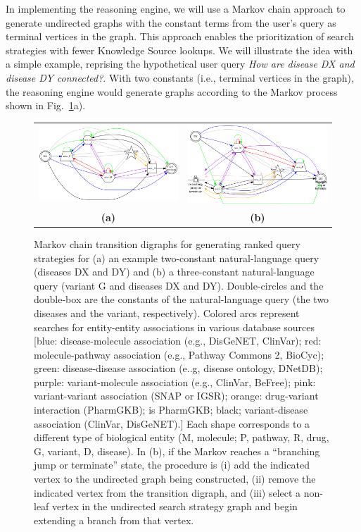 \documentclass[11pt,notitlepage]{article}
\begin{document}
In implementing the reasoning engine, we will use a Markov chain approach to
generate undirected graphs with the constant terms from the user's query as
terminal vertices in the graph. This approach enables the prioritization of
search strategies with fewer Knowledge Source lookups.  We will illustrate the
idea with a simple example, reprising the hypothetical user query {\em How are
  disease DX and disease DY connected?}. With two constants (i.e., terminal
vertices in the graph), the reasoning engine would generate graphs according to
the Markov process shown in Fig.~\ref{fig:mp}a).
\begin{figure}[h!]
  \begin{tabular}{cc}
    \includegraphics[width=3in]{markov1.png} &
    \includegraphics[width=3in]{markov2.png} \\
                    {\bf (a)} & {\bf (b)}
  \end{tabular}
  \caption{Markov chain transition digraphs for generating ranked query
    strategies for (a) an example two-constant natural-language query (diseases
    DX and DY) and (b) a three-constant natural-language query (variant G and
    diseases DX and DY). Double-circles and the double-box are the constants of
    the natural-language query (the two diseases and the variant, respectively).
    Colored arcs represent searches for entity-entity associations in various
    database sources [blue: disease-molecule association (e.g., DisGeNET,
      ClinVar); red: molecule-pathway association (e.g., Pathway Commons 2,
      BioCyc); green: disease-disease association (e..g, disease ontology,
      DNetDB); purple: variant-molecule association (e.g., ClinVar, BeFree);
      pink: variant-variant association (SNAP or IGSR); orange: drug-variant
      interaction (PharmGKB); is PharmGKB; black; variant-disease association
      (ClinVar, DisGeNET).] Each shape corresponds to a different type of
    biological entity (M, molecule; P, pathway, R, drug, G, variant, D,
    disease). In (b), if the Markov reaches a ``branching jump or terminate''
    state, the procedure is (i) add the indicated vertex to the undirected graph
    being constructed, (ii) remove the indicated vertex from the transition
    digraph, and (iii) select a non-leaf vertex in the undirected search
    strategy graph and begin extending a branch from that vertex.}
  \label{fig:mp}    
\end{figure}
\end{document}
